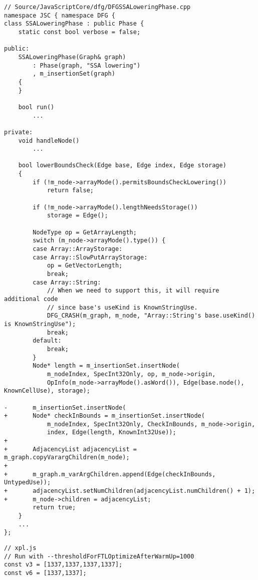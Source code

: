 \begin{figure*}[t]
    \begin{center}\vspace{-2em}
        \begin{lstlisting}[style=JSC++, caption=JavaScriptCore: Out-Of-Bounds Read/Write From Improper Bounds Speculazation]
// Source/JavaScriptCore/dfg/DFGSSALoweringPhase.cpp
namespace JSC { namespace DFG {
class SSALoweringPhase : public Phase {
    static const bool verbose = false;
   
public:
    SSALoweringPhase(Graph& graph)
        : Phase(graph, "SSA lowering")
        , m_insertionSet(graph)
    {
    }
   
    bool run()
        ...
    
private:
    void handleNode()
        ... 
   
    bool lowerBoundsCheck(Edge base, Edge index, Edge storage)
    {
        if (!m_node->arrayMode().permitsBoundsCheckLowering())
            return false;
       
        if (!m_node->arrayMode().lengthNeedsStorage())
            storage = Edge();
       
        NodeType op = GetArrayLength;
        switch (m_node->arrayMode().type()) {
        case Array::ArrayStorage:
        case Array::SlowPutArrayStorage:
            op = GetVectorLength;
            break;
        case Array::String:
            // When we need to support this, it will require additional code
            // since base's useKind is KnownStringUse.
            DFG_CRASH(m_graph, m_node, "Array::String's base.useKind() is KnownStringUse");
            break;
        default:
            break;
        }
        Node* length = m_insertionSet.insertNode(
            m_nodeIndex, SpecInt32Only, op, m_node->origin,
            OpInfo(m_node->arrayMode().asWord()), Edge(base.node(), KnownCellUse), storage);

-       m_insertionSet.insertNode(
+       Node* checkInBounds = m_insertionSet.insertNode(
            m_nodeIndex, SpecInt32Only, CheckInBounds, m_node->origin,
            index, Edge(length, KnownInt32Use));
+
+       AdjacencyList adjacencyList = m_graph.copyVarargChildren(m_node);
+
+       m_graph.m_varArgChildren.append(Edge(checkInBounds, UntypedUse));
+       adjacencyList.setNumChildren(adjacencyList.numChildren() + 1);
+       m_node->children = adjacencyList;
        return true;
    }
    ...   
};
\end{lstlisting}
\end{center}\vspace{-2em}
\begin{center}
\begin{lstlisting}[style=JS,caption=PoC Crash]
// xpl.js
// Run with --thresholdForFTLOptimizeAfterWarmUp=1000
const v3 = [1337,1337,1337,1337];
const v6 = [1337,1337];


\end{lstlisting}
\end{center}
\end{figure*}
